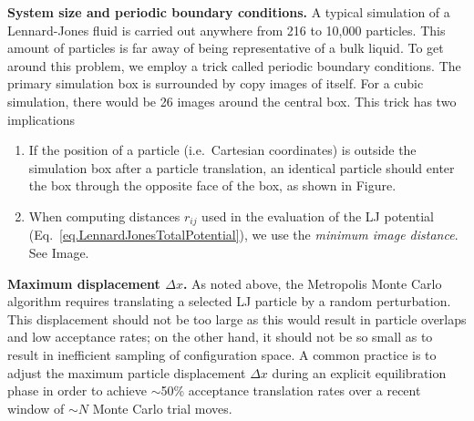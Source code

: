 \documentclass[aip,jcp,preprint,superscriptaddress,floatfix]{revtex4-1}
\begin{document}
\textbf{System size and periodic boundary conditions.} 
A typical simulation of a Lennard-Jones fluid is carried out anywhere from 216 to 10,000 particles. 
This amount of particles is far away of being representative of a bulk liquid. 
To get around this problem, we employ a trick called periodic boundary conditions. 
The primary simulation box is surrounded
by copy images of itself. For a cubic simulation, there would be 26 
images around the central box. This trick has two implications
\begin{enumerate}
\setlength{\itemsep}{0em} %
	\item If the position of a particle (i.e.\ Cartesian coordinates) is
		outside the simulation box after a particle translation, 
		an identical particle should enter the box through the
		opposite face of the box, as shown in Figure.
	\item When computing distances $r_{ij}$ used in the evaluation of the LJ potential (Eq.~\ref{eq.LennardJonesTotalPotential}), we use the \textit{minimum image distance}. See Image.
\end{enumerate}

\textbf{Maximum displacement $\Delta x$.} 
As noted above, the Metropolis Monte Carlo algorithm requires translating a selected LJ particle by a random perturbation. 
This displacement should not be too large as this would result in particle overlaps and low acceptance rates; on the other hand, it should not be so small as to result in inefficient sampling of configuration space.
A common practice is to adjust the maximum particle displacement $\Delta x$ during an explicit equilibration phase in order to achieve $\sim$50\% acceptance translation rates over a recent window of $\sim N$ Monte Carlo trial moves. 
\end{document}

